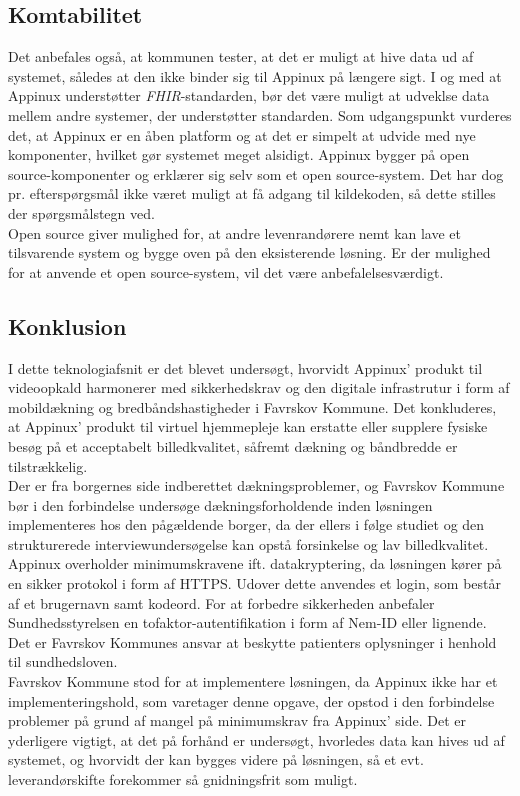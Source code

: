 \subsection{Komtabilitet}
Det anbefales også, at kommunen tester, at det er muligt at hive data ud af systemet, således at den ikke binder sig til Appinux på længere sigt. I og med at Appinux understøtter \textit{FHIR}-standarden, bør det være muligt at udveklse data mellem andre systemer, der understøtter standarden. Som udgangspunkt vurderes det, at Appinux er en åben platform og at det er simpelt at udvide med nye komponenter, hvilket gør systemet meget alsidigt. Appinux bygger på open source-komponenter og erklærer sig selv som et open source-system. Det har dog pr. efterspørgsmål ikke været muligt at få adgang til kildekoden, så dette stilles der spørgsmålstegn ved.\\Open source giver mulighed for, at andre levenrandørere nemt kan lave et tilsvarende system og bygge oven på den eksisterende løsning. Er der mulighed for at anvende et open source-system, vil det være anbefalelsesværdigt.
\subsection{Konklusion}
I dette teknologiafsnit er det blevet undersøgt, hvorvidt Appinux’ produkt til videoopkald harmonerer med sikkerhedskrav og den digitale infrastrutur i form af mobildækning og bredbåndshastigheder i Favrskov Kommune.
Det konkluderes, at Appinux’ produkt til virtuel hjemmepleje kan erstatte eller supplere fysiske besøg på et acceptabelt billedkvalitet, såfremt dækning og båndbredde er tilstrækkelig.
\\Der er fra borgernes side indberettet dækningsproblemer, og Favrskov Kommune bør i den forbindelse undersøge dækningsforholdende inden løsningen implementeres hos den pågældende borger, da der ellers i følge studiet og den strukturerede interviewundersøgelse kan opstå forsinkelse og lav billedkvalitet.\\
Appinux overholder minimumskravene ift. datakryptering, da løsningen kører på en sikker protokol i form af HTTPS. Udover dette anvendes et login, som består af et brugernavn samt kodeord. For at forbedre sikkerheden anbefaler Sundhedsstyrelsen en tofaktor-autentifikation i form af Nem-ID eller lignende. Det er Favrskov Kommunes ansvar at beskytte patienters oplysninger i henhold til sundhedsloven.\\ 
Favrskov Kommune stod for at implementere løsningen, da Appinux ikke har et implementeringshold, som varetager denne opgave, der opstod i den forbindelse problemer på grund af mangel på minimumskrav fra Appinux' side. Det er yderligere vigtigt, at det på forhånd er undersøgt, hvorledes data kan hives ud af systemet, og hvorvidt der kan bygges videre på løsningen, så et evt. leverandørskifte forekommer så gnidningsfrit som muligt.
